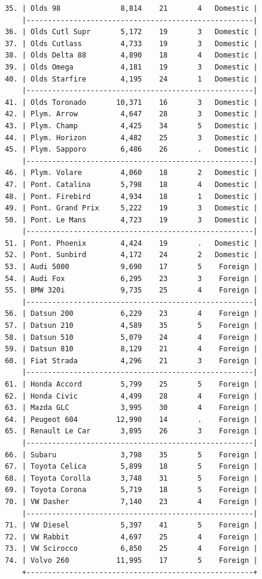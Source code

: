 \documentclass[
]{book}
\begin{document}
\begin{verbatim}
 35. | Olds 98              8,814    21       4   Domestic |
     |-----------------------------------------------------|
 36. | Olds Cutl Supr       5,172    19       3   Domestic |
 37. | Olds Cutlass         4,733    19       3   Domestic |
 38. | Olds Delta 88        4,890    18       4   Domestic |
 39. | Olds Omega           4,181    19       3   Domestic |
 40. | Olds Starfire        4,195    24       1   Domestic |
     |-----------------------------------------------------|
 41. | Olds Toronado       10,371    16       3   Domestic |
 42. | Plym. Arrow          4,647    28       3   Domestic |
 43. | Plym. Champ          4,425    34       5   Domestic |
 44. | Plym. Horizon        4,482    25       3   Domestic |
 45. | Plym. Sapporo        6,486    26       .   Domestic |
     |-----------------------------------------------------|
 46. | Plym. Volare         4,060    18       2   Domestic |
 47. | Pont. Catalina       5,798    18       4   Domestic |
 48. | Pont. Firebird       4,934    18       1   Domestic |
 49. | Pont. Grand Prix     5,222    19       3   Domestic |
 50. | Pont. Le Mans        4,723    19       3   Domestic |
     |-----------------------------------------------------|
 51. | Pont. Phoenix        4,424    19       .   Domestic |
 52. | Pont. Sunbird        4,172    24       2   Domestic |
 53. | Audi 5000            9,690    17       5    Foreign |
 54. | Audi Fox             6,295    23       3    Foreign |
 55. | BMW 320i             9,735    25       4    Foreign |
     |-----------------------------------------------------|
 56. | Datsun 200           6,229    23       4    Foreign |
 57. | Datsun 210           4,589    35       5    Foreign |
 58. | Datsun 510           5,079    24       4    Foreign |
 59. | Datsun 810           8,129    21       4    Foreign |
 60. | Fiat Strada          4,296    21       3    Foreign |
     |-----------------------------------------------------|
 61. | Honda Accord         5,799    25       5    Foreign |
 62. | Honda Civic          4,499    28       4    Foreign |
 63. | Mazda GLC            3,995    30       4    Foreign |
 64. | Peugeot 604         12,990    14       .    Foreign |
 65. | Renault Le Car       3,895    26       3    Foreign |
     |-----------------------------------------------------|
 66. | Subaru               3,798    35       5    Foreign |
 67. | Toyota Celica        5,899    18       5    Foreign |
 68. | Toyota Corolla       3,748    31       5    Foreign |
 69. | Toyota Corona        5,719    18       5    Foreign |
 70. | VW Dasher            7,140    23       4    Foreign |
     |-----------------------------------------------------|
 71. | VW Diesel            5,397    41       5    Foreign |
 72. | VW Rabbit            4,697    25       4    Foreign |
 73. | VW Scirocco          6,850    25       4    Foreign |
 74. | Volvo 260           11,995    17       5    Foreign |
     +-----------------------------------------------------+
\end{verbatim}
\end{document}
